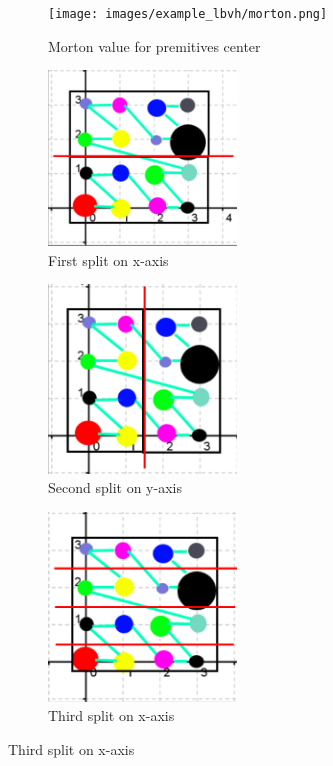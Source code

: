 \documentclass[11pt,a4paper]{article}
\begin{document}
\begin{figure}[H]	
     \centering
     \begin{subfigure}[b]{0.475\textwidth}
         \centering
         \captionsetup{justification=centering}
         \texttt{[image: images/example\_lbvh/morton.png]}
         \caption{Morton value for premitives center}
         \label{fig:pi_4000}
     \end{subfigure}
     \hfill
     \begin{subfigure}[b]{0.475\textwidth}
         \centering
         \captionsetup{justification=centering}
         \includegraphics[width=5cm]{images/example_lbvh/01.png}
         \caption{First split on x-axis}
         \label{fig:pi_5000}
     \end{subfigure}
     \hfill
     \begin{subfigure}[b]{0.475\textwidth}
         \centering
         \captionsetup{justification=centering}
         \includegraphics[width=5cm]{images/example_lbvh/02.png}
         \caption{Second split on y-axis}
         \label{fig:pi_18000}
     \end{subfigure}
        \captionsetup{justification=centering,margin=2cm}
             \hfill
     \begin{subfigure}[b]{0.475\textwidth}
         \centering
         \captionsetup{justification=centering}
         \includegraphics[width=5cm]{images/example_lbvh/03.png}
         \caption{Third split on x-axis}
         \label{fig:pi_18000}
     \end{subfigure}
        \captionsetup{justification=centering,margin=2cm}


\end{figure}
\end{document}

